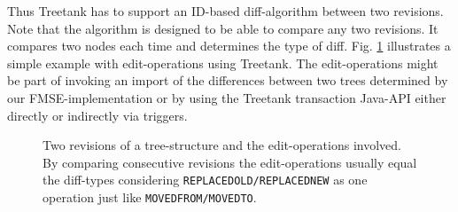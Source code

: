 Thus Treetank has to support an ID-based diff-algorithm between two revisions. Note that the algorithm is designed to be able to compare any two revisions. It compares two nodes each time and determines the type of diff. Fig. \ref{fig:diff} illustrates a simple example with edit-operations using Treetank. The edit-operations might be part of invoking an import of the differences between two trees determined by our FMSE-implementation or by using the Treetank transaction Java-API either directly or indirectly via triggers.

\begin{figure}[tb]
\caption{\label{fig:diff} Two revisions of a tree-structure and the edit-operations involved. By comparing consecutive revisions the edit-operations usually equal the diff-types considering \texttt{REPLACEDOLD/REPLACEDNEW} as one operation just like \texttt{MOVEDFROM/MOVEDTO}.}
\end{figure} 

